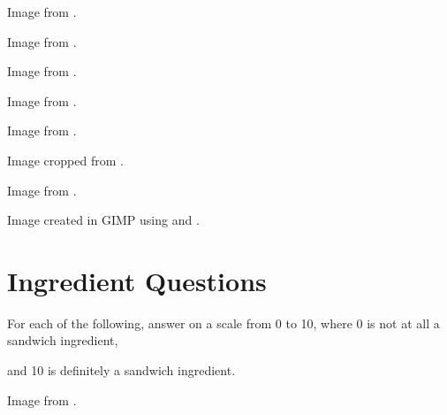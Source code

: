	\begin{minipage}{\textwidth}
		Image from \cite{toastSandwich}.
	\end{minipage}

	\begin{minipage}{\textwidth}
		Image from \cite{oreo}.
	\end{minipage}

	\begin{minipage}{\textwidth}
		Image from \cite{ritzCracker}.
	\end{minipage}

	\begin{minipage}{\textwidth}
		Image from \cite{sushiBurrito}.
	\end{minipage}

	\begin{minipage}{\textwidth}
		Image from \cite{nigiri}.
	\end{minipage}

	\begin{minipage}{\textwidth}
		Image cropped from \cite{cheese}.
	\end{minipage}

	\begin{minipage}{\textwidth}
		Image from \cite{salad}.
	\end{minipage}

	\begin{minipage}{\textwidth}
		Image created in GIMP using \cite{breadSlices} and \cite{brick}.
	\end{minipage}

\section{Ingredient Questions}
	For each of the following, answer on a scale from 0 to 10, where 0 is not at all a sandwich ingredient,

and 10 is definitely a sandwich ingredient.
	\begin{minipage}{\textwidth}
		Image from \cite{coldCuts}.
	\end{minipage}

